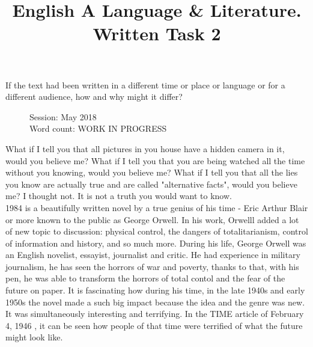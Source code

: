 \documentclass[a4paper,12pt]{article}
\title{English A Language \& Literature. Written Task 2}
\date{}
\author{}
\begin{document}
\maketitle
\begin{center}
  If the text had been written in a different time or place or language or for a different audience, how and why might it differ?
\end{center}
\begin{flushleft}
  \begin{figure}
    Session: May 2018\\
    Word count: WORK IN PROGRESS\\
    \end{figure}
\end{flushleft}
\newpage

What if I tell you that all pictures in you house have a hidden camera in it, would you believe me? What if I tell you that you are being watched all the time without you knowing, would you believe me?  What if I tell you that all the lies you know are actually true and are called "alternative facts", would you believe me? I thought not. It is not a truth you would want to know. \\

1984 is a beautifully written novel by a true genius of his time - Eric Arthur Blair or more known to the public as George Orwell. In his work, Orwelll added a lot of new topic to discussion: physical control, the dangers of totalitarianism, control of information and history, and so much more. During his life, George Orwell was an English novelist, essayist, journalist and critic. He had experience in military journalism, he has seen the horrors of war and poverty, thanks to that, with his pen, he was able to transform the horrors of total contol and the fear of the future on paper. It is fascinating how during his time, in the late 1940s and early 1950s the novel made a such big impact because the idea and the genre was new. It was simultaneously interesting and terrifying. In the TIME article of February 4, 1946 \cite{time}, it can be seen how people of that time were terrified of what the future might look like. \\
\end{document}
